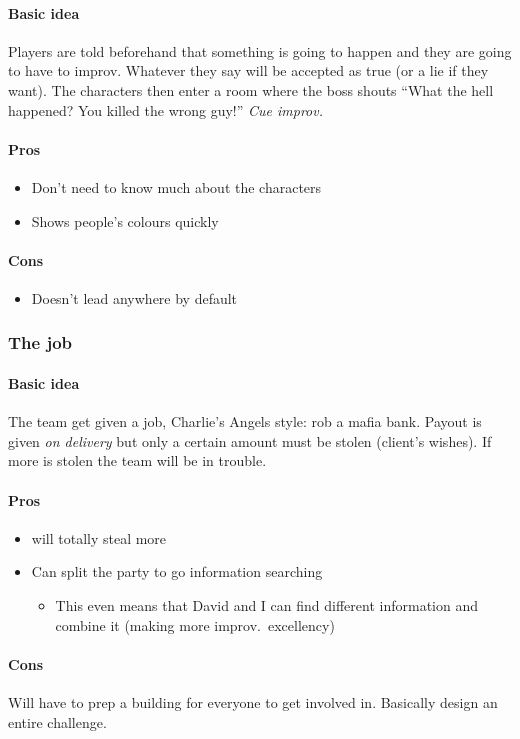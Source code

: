\documentclass[a4paper,twocolumn,oneside]{memoir}
\begin{document}
\paragraph{Basic idea}

Players are told beforehand that something is going to happen and they are going
to have to improv. Whatever they say will be accepted as true (or a lie if they
want). The characters then enter a room where the boss shouts ``What the hell
happened? You killed the wrong guy!'' \emph{Cue improv.}

\paragraph{Pros}

\begin{itemize}
\item Don't need to know much about the characters
\item Shows people's colours quickly
\end{itemize}

\paragraph{Cons}

\begin{itemize}
\item Doesn't lead anywhere by default
\end{itemize}


\subsubsection{The job}
\label{sec:job}

\paragraph{Basic idea}

The team get given a job, Charlie's Angels style: rob a mafia bank. Payout is
given \emph{on delivery} but only a certain amount must be stolen (client's
wishes). If more is stolen the team will be in trouble.

\paragraph{Pros}

\begin{itemize}
\item {} will totally steal more
\item Can split the party to go information searching
  \begin{itemize}
  \item This even means that David and I can find different information and
    combine it (making more improv.\ excellency)
  \end{itemize}
\end{itemize}

\paragraph{Cons}

Will have to prep a building for everyone to get involved in. Basically design
an entire challenge.
\end{document}
